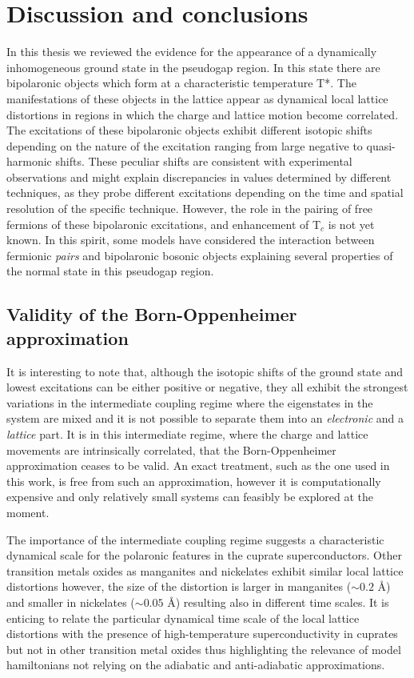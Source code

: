 \chapter{Discussion and conclusions}
\label{chap:conclusions}

In this thesis we reviewed the evidence for the appearance of a dynamically inhomogeneous ground state in the pseudogap region. 
In this state there are bipolaronic objects which form at a characteristic temperature T*. 
The manifestations of these objects in the lattice appear as dynamical local lattice distortions in regions in which the charge and lattice motion become correlated. 
The excitations of these bipolaronic objects exhibit different isotopic shifts depending on the nature of the excitation ranging from large negative to quasi-harmonic shifts. 
These peculiar shifts are consistent with experimental observations and might explain discrepancies in values determined by different techniques, as they probe different excitations depending on the time and spatial resolution of the specific technique. 
However, the role in the pairing of free fermions of these bipolaronic excitations, and enhancement of T$_c$ is not yet known. 
In this spirit, some models have considered the interaction between fermionic \textit{pairs} and bipolaronic bosonic objects \cite{Bussmann-Holder2005,Mihailovic2001,Bar-Yam1991,doi:10.1142/S0217979200003812} explaining several properties of the normal state in this pseudogap region. 

\section{Validity of the Born-Oppenheimer approximation}

It is interesting to note that, although the isotopic shifts of the ground state and lowest excitations can be either positive or negative, they all exhibit the strongest variations in the intermediate coupling regime where the eigenstates in the system are mixed and it is not possible to separate them into an \textit{electronic} and a \textit{lattice} part.
It is in this intermediate regime, where the charge and lattice movements are intrinsically correlated, that the Born-Oppenheimer approximation ceases to be valid.
An exact treatment, such as the one used in this work, is free from such an approximation, however it is computationally expensive and  only relatively small systems can feasibly be explored at the moment.

The importance of the intermediate coupling regime suggests a characteristic dynamical scale for the polaronic features in the cuprate superconductors. 
Other transition metals oxides as manganites and nickelates exhibit similar local lattice distortions however, the size of the distortion is larger in manganites ($\sim 0.2$ \AA) \cite{Tyson1996} and smaller in nickelates ($\sim 0.05$ \AA) \cite{Acosta-Alejandro2008} resulting also in different time scales. 
It is enticing to relate the particular dynamical time scale of the local lattice distortions with the presence of high-temperature superconductivity in cuprates but not in other transition metal oxides thus highlighting the relevance of model hamiltonians not relying on the adiabatic and anti-adiabatic approximations.

